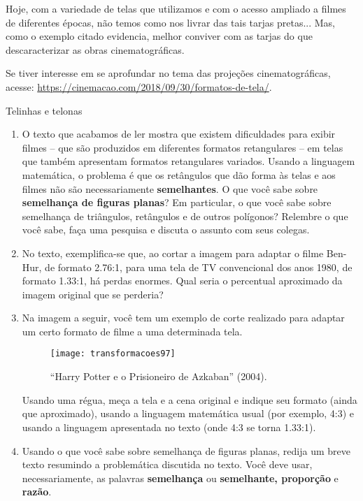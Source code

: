 Hoje, com a variedade de telas que utilizamos e com o acesso ampliado a filmes de diferentes épocas, não temos como nos livrar das tais tarjas pretas... Mas, como o exemplo citado evidencia, melhor conviver com as tarjas do que descaracterizar as obras cinematográficas. 

\begin{knowledge}
Se tiver interesse em se aprofundar no tema das projeções cinematográficas, acesse: \url{https://cinemacao.com/2018/09/30/formatos-de-tela/}.
\end{knowledge}

\begin{task}{Telinhas e telonas}
\begin{enumerate}
\item O texto que acabamos de ler mostra que existem dificuldades para exibir filmes – que são produzidos em diferentes formatos retangulares – em telas que também apresentam formatos retangulares variados. Usando a linguagem matemática, o problema é que os retângulos que dão forma às telas e aos filmes não são necessariamente \textbf{semelhantes}. O que você sabe sobre \textbf{semelhança de figuras planas}? Em particular, o que você sabe sobre semelhança de triângulos, retângulos e de outros polígonos? Relembre o que você sabe, faça uma pesquisa e discuta o assunto com seus colegas.

\item No texto, exemplifica-se que, ao cortar a imagem para adaptar o filme Ben-Hur, de formato 2.76:1, para uma tela de TV convencional dos anos 1980, de formato 1.33:1, há perdas enormes. Qual seria o percentual aproximado da imagem original que se perderia?  

\item Na imagem a seguir, você tem um exemplo de corte realizado para adaptar um certo formato de filme a uma determinada tela. 

\begin{figure}[H]
\centering
 
\texttt{[image: transformacoes97]}
\caption{“Harry Potter e o Prisioneiro de Azkaban” (2004).}
\label{}
\end{figure} 

Usando uma régua, meça a tela e a cena original e indique seu formato (ainda que aproximado), usando a linguagem matemática usual (por exemplo, 4:3) e usando a linguagem apresentada no texto (onde 4:3 se torna 1.33:1). 

\item Usando o que você sabe sobre semelhança de figuras planas, redija um breve texto resumindo a problemática discutida no texto. Você deve usar, necessariamente, as palavras \textbf{semelhança} ou \textbf{semelhante, proporção} e \textbf{razão}. 
\end{enumerate}
\end{task}


